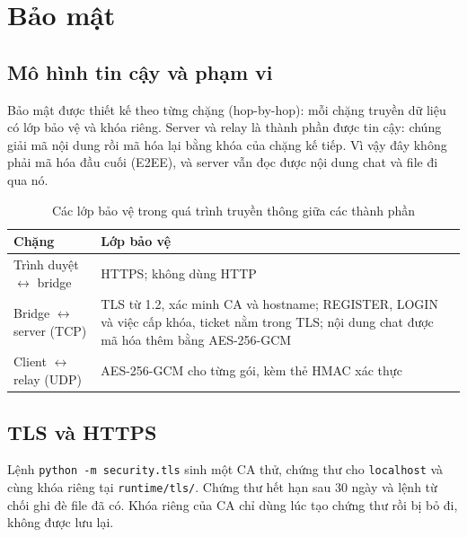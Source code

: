 \section{Bảo mật}

\subsection{Mô hình tin cậy và phạm vi}
Bảo mật được thiết kế theo từng chặng (hop-by-hop): mỗi chặng truyền dữ liệu có lớp bảo vệ và khóa riêng. Server và relay là thành phần được tin cậy: chúng giải mã nội dung rồi mã hóa lại bằng khóa của chặng kế tiếp. Vì vậy đây không phải mã hóa đầu cuối (E2EE), và server vẫn đọc được nội dung chat và file đi qua nó.


\begin{table}[H]
    \centering
    \small
    \renewcommand{\arraystretch}{1.4}

    \begin{tabularx}{\textwidth}{
        @{}
        >{\raggedright\arraybackslash}p{3.2cm}
        >{\raggedright\arraybackslash}X
        @{}
    }
        \toprule
        \textbf{Chặng} & \textbf{Lớp bảo vệ} \\
        \midrule

        Trình duyệt $\leftrightarrow$ bridge
        & HTTPS; không dùng HTTP \\

        Bridge $\leftrightarrow$ server (TCP)
        & TLS từ 1.2, xác minh CA và hostname; REGISTER, LOGIN và việc cấp khóa, ticket nằm trong TLS; nội dung chat được mã hóa thêm bằng AES-256-GCM \\

        Client $\leftrightarrow$ relay (UDP)
        & AES-256-GCM cho từng gói, kèm thẻ HMAC xác thực \\

        \bottomrule
    \end{tabularx}
    \caption{Các lớp bảo vệ trong quá trình truyền thông giữa các thành phần}
\end{table}


\subsection{TLS và HTTPS}
Lệnh \texttt{python -m security.tls} sinh một CA thử, chứng thư cho \texttt{localhost} và  cùng khóa riêng tại \texttt{runtime/tls/}. Chứng thư hết hạn sau 30 ngày và lệnh từ chối ghi đè file đã có. Khóa riêng của CA chỉ dùng lúc tạo chứng thư rồi bị bỏ đi, không được lưu lại.


